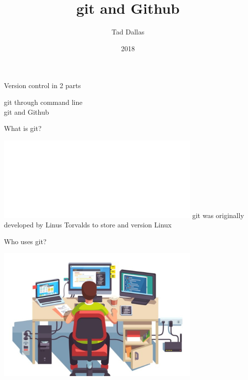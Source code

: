 \documentclass[12pt]{beamer}
\title{\Large git and Github}
\author{Tad Dallas}
\date{2018}
\begin{document}
\maketitle


\begin{frame}

	\begin{flushright}
		{\Large \textcolor{boss2}{Version control in 2 parts}}
	\end{flushright}

	\Huge	
	\textcolor{boss3}{git through command line} \\
	\bigskip
	\bigskip
	\textcolor{boss3}{git and Github} \\

\end{frame}







\begin{frame}

	\begin{flushright}
		{\Large \textcolor{boss2}{What is git?}}
	\end{flushright}
  \includegraphics[width=0.75\textwidth]{figs/Git-Logo-White.png}
	\textcolor{boss3}{git was originally developed by Linus Torvalds to store and version Linux}

\end{frame}






\begin{frame}

	\begin{flushright}
		\Large \textcolor{boss2}{Who uses git?} 
	\end{flushright}
	
	\begin{center}
	  \includegraphics[width=0.75\textwidth]{figs/stereotype.jpg}
	\end{center}

\end{frame}
\end{document}
